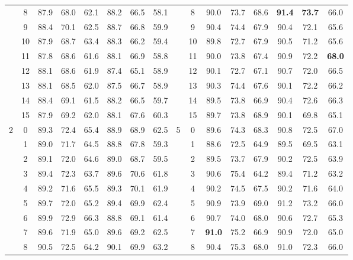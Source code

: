 \begin{table}[p]
{\begin{tabular}{c c | c c c | c c c || c c | c c c | c c c}
             & 8 & 87.9 & 68.0 & 62.1 & 88.2 & 66.5 & 58.1 &  & 8 & 90.0 & 73.7 & 68.6 & \textbf{91.4} & \textbf{73.7} & 66.0 \\
             & 9 & 88.4 & 70.1 & 62.5 & 88.7 & 66.8 & 59.9 &  & 9 & 90.4 & 74.4 & 67.9 & 90.4 & 72.1 & 65.6 \\
             & 10 & 87.9 & 68.7 & 63.4 & 88.3 & 66.2 & 59.4 &  & 10 & 89.8 & 72.7 & 67.9 & 90.5 & 71.2 & 65.6 \\
             & 11 & 87.8 & 68.6 & 61.6 & 88.1 & 66.9 & 58.8 &  & 11 & 90.0 & 73.8 & 67.4 & 90.9 & 72.2 & \textbf{68.0} \\
             & 12 & 88.1 & 68.6 & 61.9 & 87.4 & 65.1 & 58.9 &  & 12 & 90.1 & 72.7 & 67.1 & 90.7 & 72.0 & 66.5 \\
             & 13 & 88.1 & 68.5 & 62.0 & 87.5 & 66.7 & 58.9 &  & 13 & 90.3 & 74.4 & 67.6 & 90.1 & 72.2 & 66.2 \\
             & 14 & 88.4 & 69.1 & 61.5 & 88.2 & 66.5 & 59.7 &  & 14 & 89.5 & 73.8 & 66.9 & 90.4 & 72.6 & 66.3 \\
             & 15 & 87.9 & 69.2 & 62.0 & 88.1 & 67.6 & 60.3 &  & 15 & 89.7 & 73.8 & 68.9 & 90.1 & 69.8 & 65.1 \\
            \midrule
            \multirow{16}{*}{2} & 0 & 89.3 & 72.4 & 65.4 & 88.9 & 68.9 & 62.5 & \multirow{16}{*}{5} & 0 & 89.6 & 74.3 & 68.3 & 90.8 & 72.5 & 67.0 \\
             & 1 & 89.0 & 71.7 & 64.5 & 88.8 & 67.8 & 59.3 &  & 1 & 88.6 & 72.5 & 64.9 & 89.5 & 69.5 & 63.1 \\
             & 2 & 89.1 & 72.0 & 64.6 & 89.0 & 68.7 & 59.5 &  & 2 & 89.5 & 73.7 & 67.9 & 90.2 & 72.5 & 63.9 \\
             & 3 & 89.4 & 72.3 & 63.7 & 89.6 & 70.6 & 61.8 &  & 3 & 90.6 & 75.4 & 64.2 & 89.4 & 71.2 & 63.2 \\
             & 4 & 89.2 & 71.6 & 65.5 & 89.3 & 70.1 & 61.9 &  & 4 & 90.2 & 74.5 & 67.5 & 90.2 & 71.6 & 64.0 \\
             & 5 & 89.7 & 72.0 & 65.2 & 89.4 & 69.9 & 62.4 &  & 5 & 90.9 & 73.9 & 69.0 & 91.2 & 73.2 & 66.0 \\
             & 6 & 89.9 & 72.9 & 66.3 & 88.8 & 69.1 & 61.4 &  & 6 & 90.7 & 74.0 & 68.0 & 90.6 & 72.7 & 65.3 \\
             & 7 & 89.6 & 71.9 & 65.0 & 89.6 & 69.2 & 62.5 &  & 7 & \textbf{91.0} & 75.2 & 66.9 & 90.9 & 72.0 & 65.0 \\
             & 8 & 90.5 & 72.5 & 64.2 & 90.1 & 69.9 & 63.2 &  & 8 & 90.4 & 75.3 & 68.0 & 91.0 & 72.3 & 66.0 \\

\end{tabular}}
\end{table}
